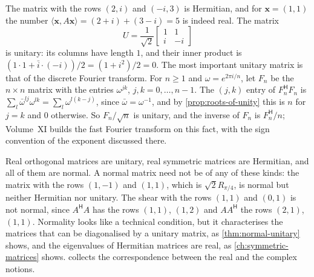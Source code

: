 The matrix with the rows $(2,i)$ and $(-i,3)$ is Hermitian, and for $\mathbf x=(1,1)$ the number $\langle\mathbf x,A\mathbf x\rangle=(2+i)+(3-i)=5$ is indeed real. The matrix
\[
U=\frac1{\sqrt2}\begin{bmatrix}1&1\\i&-i\end{bmatrix}
\]
is unitary: its columns have length $1$, and their inner product is $(1\cdot1+\bar i\cdot(-i))/2=(1+i^2)/2=0$. The most important unitary matrix is that of the discrete Fourier transform. For $n\ge1$ and $\omega=e^{2\pi i/n}$, let $F_n$ be the $n\times n$ matrix with the entries $\omega^{jk}$, $j,k=0,\ldots,n-1$. The $(j,k)$ entry of $F_n^{\mathsf H}F_n$ is $\sum_l\bar\omega^{lj}\omega^{lk}=\sum_l\omega^{l(k-j)}$, since $\bar\omega=\omega^{-1}$, and by \cref{prop:roots-of-unity} this is $n$ for $j=k$ and $0$ otherwise. So $F_n/\sqrt n$ is unitary, and the inverse of $F_n$ is $F_n^{\mathsf H}/n$; Volume~XI builds the fast Fourier transform on this fact, with the sign convention of the exponent discussed there.

Real orthogonal matrices are unitary, real symmetric matrices are Hermitian, and all of them are normal. A normal matrix need not be of any of these kinds: the matrix with the rows $(1,-1)$ and $(1,1)$, which is $\sqrt2R_{\pi/4}$, is normal but neither Hermitian nor unitary. The shear with the rows $(1,1)$ and $(0,1)$ is not normal, since $A^{\mathsf H}A$ has the rows $(1,1)$, $(1,2)$ and $AA^{\mathsf H}$ the rows $(2,1)$, $(1,1)$. Normality looks like a technical condition, but it characterises the matrices that can be diagonalised by a unitary matrix, as \cref{thm:normal-unitary} shows, and the eigenvalues of Hermitian matrices are real, as \cref{ch:symmetric-matrices} shows.  collects the correspondence between the real and the complex notions.


